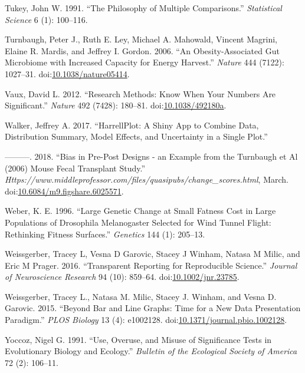 \documentclass[]{article}
\theoremstyle{definition}
\theoremstyle{definition}
\theoremstyle{definition}
\theoremstyle{remark}
\begin{document}
\hypertarget{ref-Tukey_Philosophy_1991}{}
Tukey, John W. 1991. ``The Philosophy of Multiple Comparisons.''
\emph{Statistical Science} 6 (1): 100--116.

\hypertarget{ref-Turnbaugh_obesityassociated_2006a}{}
Turnbaugh, Peter J., Ruth E. Ley, Michael A. Mahowald, Vincent Magrini,
Elaine R. Mardis, and Jeffrey I. Gordon. 2006. ``An Obesity-Associated
Gut Microbiome with Increased Capacity for Energy Harvest.''
\emph{Nature} 444 (7122): 1027--31.
doi:\href{https://doi.org/10.1038/nature05414}{10.1038/nature05414}.

\hypertarget{ref-Vaux_Research_2012}{}
Vaux, David L. 2012. ``Research Methods: Know When Your Numbers Are
Significant.'' \emph{Nature} 492 (7428): 180--81.
doi:\href{https://doi.org/10.1038/492180a}{10.1038/492180a}.

\hypertarget{ref-Walker_HarrellPlot_2017}{}
Walker, Jeffrey A. 2017. ``HarrellPlot: A Shiny App to Combine Data,
Distribution Summary, Model Effects, and Uncertainty in a Single Plot.''

\hypertarget{ref-Walker_Bias_2018}{}
---------. 2018. ``Bias in Pre-Post Designs - an Example from the
Turnbaugh et Al (2006) Mouse Fecal Transplant Study.''
\emph{Https://www.middleprofessor.com/files/quasipubs/change\_scores.html},
March.
doi:\href{https://doi.org/10.6084/m9.figshare.6025571}{10.6084/m9.figshare.6025571}.

\hypertarget{ref-Weber_Large_1996}{}
Weber, K. E. 1996. ``Large Genetic Change at Small Fatness Cost in Large
Populations of Drosophila Melanogaster Selected for Wind Tunnel Flight:
Rethinking Fitness Surfaces.'' \emph{Genetics} 144 (1): 205--13.

\hypertarget{ref-Weissgerber_Transparent_2016}{}
Weissgerber, Tracey L, Vesna D Garovic, Stacey J Winham, Natasa M Milic,
and Eric M Prager. 2016. ``Transparent Reporting for Reproducible
Science.'' \emph{Journal of Neuroscience Research} 94 (10): 859--64.
doi:\href{https://doi.org/10.1002/jnr.23785}{10.1002/jnr.23785}.

\hypertarget{ref-Weissgerber_Bar_2015}{}
Weissgerber, Tracey L., Natasa M. Milic, Stacey J. Winham, and Vesna D.
Garovic. 2015. ``Beyond Bar and Line Graphs: Time for a New Data
Presentation Paradigm.'' \emph{PLOS Biology} 13 (4): e1002128.
doi:\href{https://doi.org/10.1371/journal.pbio.1002128}{10.1371/journal.pbio.1002128}.

\hypertarget{ref-Yoccoz_Use_1991}{}
Yoccoz, Nigel G. 1991. ``Use, Overuse, and Misuse of Significance Tests
in Evolutionary Biology and Ecology.'' \emph{Bulletin of the Ecological
Society of America} 72 (2): 106--11.
\end{document}
